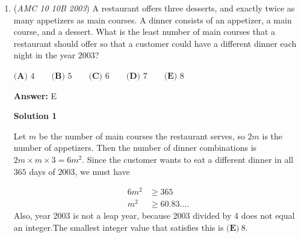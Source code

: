 \begin{enumerate}
 $\textbf{(A) } \text{a prime number} \qquad\textbf{(B) } \text{divisible by 2} \qquad\textbf{(C) } \text{divisible by 5} \qquad\textbf{(D) } \text{divisible by 7} \qquad\textbf{(E) } \text{divisible by 11}$

 \textbf{Answer: }E



\textbf{Solution 1}

Notice that $99$ players need to be eliminated for there to be declared a winner. Notice also that every match eliminates exactly one person. Therefore, $99$ matches are needed to eliminate $99$ people and therefore declare a winner. The rest of the information is irrelevant. Therefore, the total number of matches is $\text{divisible by 11}, \boxed{\text{E}}$.

 



\textbf{Solution 2}

28 people receive byes, so in the first round there are $36$ matches played. In the second round there are $28 + 36 = 64$ people, so there are 32 matches. In the subsequent rounds, there are $16, 8, 4, 2, 1$ matches played, for a total of $36 + 32 + 16 + 8 + 4 + 2 + 1 = 99$ matches. Therefore, the answer is $\rightarrow\textbf{(E) }\text{divisible by 11.}$



	\item (\textit{AMC 10 10B 2003}) A restaurant offers three desserts, and exactly twice as many appetizers as main courses. A dinner consists of an appetizer, a main course, and a dessert. What is the least number of main courses that a restaurant should offer so that a customer could have a different dinner each night in the year $2003$?


 $\textbf{(A) } 4 \qquad\textbf{(B) } 5 \qquad\textbf{(C) } 6 \qquad\textbf{(D) } 7 \qquad\textbf{(E) } 8$

 \textbf{Answer: }E



\textbf{Solution 1}

Let $m$ be the number of main courses the restaurant serves, so $2m$ is the number of appetizers. Then the number of dinner combinations is $2m\times m\times3=6m^2$. Since the customer wants to eat a different dinner in all $365$ days of $2003$, we must have

 
 \begin{align*} 6m^2 &\geq 365\\ m^2 &\geq 60.83\ldots.\end{align*}
Also, year 2003 is not a leap year, because 2003 divided by 4 does not equal an integer.The smallest integer value that satisfies this is $\boxed{\textbf{(E)}\ 8}$.


\end{enumerate}
